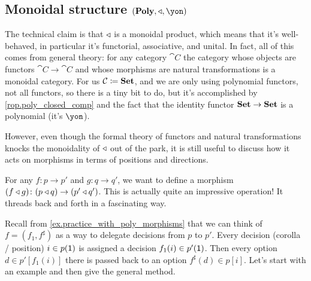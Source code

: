 \documentclass[DynamicalBook]{subfiles}
\begin{document}
\subsection{Monoidal structure $(\poly,\tri,\yon)$}\label{subsec.monoidal_struc_tri}

The technical claim is that $\mathbin{\triangleleft}$ is a monoidal product, which means that it's well-behaved, in particular it's functorial, associative, and unital. In fact, all of this comes from general theory: for any category $\cat{C}$ the category whose objects are functors $\cat{C}\to\cat{C}$ and whose morphisms are natural transformations is a monoidal category. For us $\mathcal{C}\coloneqq\textbf{Set}$, and we are only using polynomial functors, not all functors, so there is a tiny bit to do, but it's accomplished by \cref{rop.poly_closed_comp} and the fact that the identity functor $\textbf{Set}\to\textbf{Set}$ is a polynomial (it's $\yon$).

However, even though the formal theory of functors and natural transformations knocks the monoidality of $\mathbin{\triangleleft}$ out of the park, it is still useful to discuss how it acts on morphisms in terms of positions and directions.

For any $f\colon p\to p'$ and $g\colon q\to q'$, we want to define a morphism $(f\mathbin{\triangleleft} g)\colon(p\mathbin{\triangleleft} q)\to(p'\mathbin{\triangleleft} q')$. This is actually quite an impressive operation! It threads back and forth in a fascinating way. 

Recall from \cref{ex.practice_with_poly_morphisms} that we can think of $f=(f_1,f^\sharp)$ as a way to delegate decisions from $p$ to $p'$. Every decision (corolla / position) $i\in p(\textsf{1})$ is assigned a decision $f_1(i)\in p'(\textsf{1})$. Then every option $d\in p'[f_1(i)]$ there is passed back to an option $f^\sharp(d)\in p[i]$. Let's start with an example and then give the general method.
\end{document}
